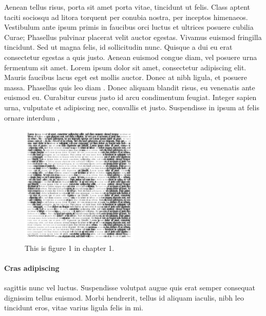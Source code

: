 Aenean tellus risus, porta sit amet porta vitae, tincidunt ut felis. Class aptent taciti sociosqu ad litora torquent per conubia nostra, per inceptos himenaeos. Vestibulum ante ipsum primis in faucibus orci luctus et ultrices posuere cubilia Curae; Phasellus pulvinar placerat velit auctor egestas. Vivamus euismod fringilla tincidunt. Sed ut magna felis, id sollicitudin nunc. Quisque a dui eu erat consectetur egestas a quis justo. Aenean euismod congue diam, vel posuere urna fermentum sit amet. Lorem ipsum dolor sit amet, consectetur adipiscing elit. Mauris faucibus lacus eget est mollis auctor. Donec at nibh ligula, et posuere massa. Phasellus quis leo diam \cite{diamantaras1996pcn}.
Donec aliquam blandit risus, eu venenatis ante euismod eu. Curabitur cursus justo id arcu condimentum feugiat. Integer sapien urna, vulputate et adipiscing nec, convallis et justo. Suspendisse in ipsum at felis ornare interdum \cite{tulone2006pts},

\begin{figure}[]
\begin{center}
\includegraphics[width=0.5\textwidth]{Koopmans_Bernardi/01x01-eps-converted-to}
\end{center}
\caption{This is figure 1 in chapter 1.}
\end{figure}

\paragraph{Cras adipiscing} sagittis nunc vel luctus. Suspendisse volutpat augue quis erat semper consequat dignissim tellus euismod. Morbi hendrerit, tellus id aliquam iaculis, nibh leo tincidunt eros, vitae varius ligula felis in mi.

